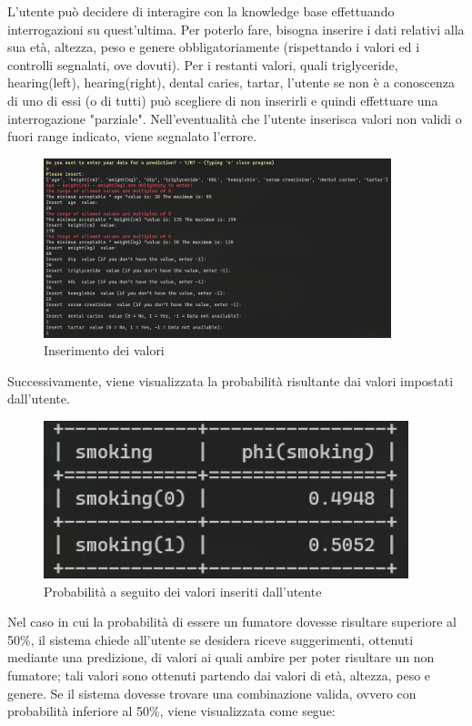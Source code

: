 \documentclass{article}
\begin{document}
L'utente può decidere di interagire con la knowledge base effettuando interrogazioni su quest’ultima. Per poterlo fare, bisogna inserire i dati relativi alla sua età, altezza, peso e genere obbligatoriamente (rispettando i valori ed i controlli segnalati, ove dovuti). Per i restanti valori, quali triglyceride, hearing(left), hearing(right), dental caries, tartar, l'utente se non è a conoscenza di uno di essi (o di tutti) può scegliere di non inserirli e quindi effettuare una interrogazione "parziale". Nell'eventualità che l'utente inserisca valori non validi o fuori range indicato, viene segnalato l'errore.

\begin{figure}[H]
        \includegraphics[width=0.9\textwidth]{interazione}
        \centering
        \caption{Inserimento dei valori}
        \centering
\end{figure}
%

\noindent
Successivamente, viene visualizzata la probabilità risultante dai valori impostati dall'utente.

\begin{figure}[H]
        \includegraphics[width=10.6cm]{probility}
        \centering
        \caption{Probabilità a seguito dei valori inseriti dall'utente}
        \centering
\end{figure}
%

\noindent
Nel caso in cui la probabilità di essere un fumatore dovesse risultare superiore al 50\%, il sistema chiede all'utente se desidera riceve suggerimenti, ottenuti mediante una predizione, di valori ai quali ambire per poter risultare un non fumatore; tali valori sono ottenuti partendo dai valori di età, altezza, peso e genere.
Se il sistema dovesse trovare una combinazione valida, ovvero con probabilità inferiore al 50\%, viene visualizzata come segue:
\end{document}
